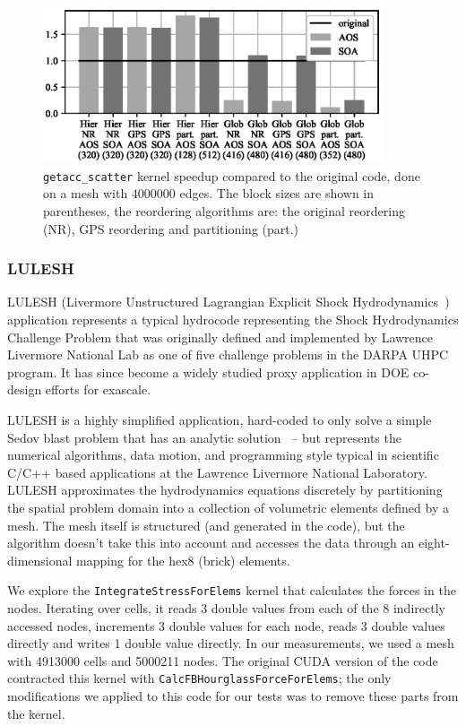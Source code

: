 \begin{figure}[Htbp]
  \centering
  \includegraphics[width=10cm]{fig/bookleaf_speedup.eps}
  \caption{\texttt{getacc\_scatter} kernel speedup compared to the original
  code, done on a mesh with $4000000$ edges. The block sizes are shown in
  parentheses, the reordering algorithms are: the original reordering (NR), GPS
  reordering and partitioning (part.)}
  \label{fig:bookleaf_speedup}
\end{figure}


\subsubsection{LULESH}\label{sec:lulesh-summary}


\noindent LULESH (Livermore Unstructured Lagrangian Explicit Shock 
Hydrodynamics~\cite{LULESH2:changes}) application represents a typical 
hydrocode representing the Shock Hydrodynamics Challenge Problem that was 
originally defined and implemented by Lawrence Livermore National Lab as one of 
five challenge problems in the DARPA UHPC program. It  has since become a widely 
studied proxy application in DOE co-design efforts for exascale. 

LULESH is a highly simplified application, hard-coded to only solve a simple
Sedov blast problem that has an analytic solution~\cite{LULESH:spec} – but
represents the numerical algorithms, data motion, and programming style typical
in scientific C/C++ based applications at the Lawrence Livermore National
Laboratory. LULESH approximates the hydrodynamics equations discretely by
partitioning the spatial problem domain into a collection of volumetric elements
defined by a mesh. The mesh itself is structured (and generated in the code), 
but the algorithm doesn't take this into account and accesses the data through 
an eight-dimensional mapping for the hex8 (brick) elements.

We explore the \texttt{IntegrateStressForElems} kernel that calculates the
forces in the nodes. Iterating over cells, it reads 3 double values from each 
of the 8 indirectly accessed nodes, increments 3 double values for each node, 
reads 3 double values directly and writes 1 double value directly. In our 
measurements, we used a mesh with \num{4913000} cells and \num{5000211}
nodes. The original CUDA version of the code contracted this kernel with
\texttt{CalcFBHourglassForceForElems}; the only modifications we applied to 
this code for our tests was to remove these parts from the kernel.

